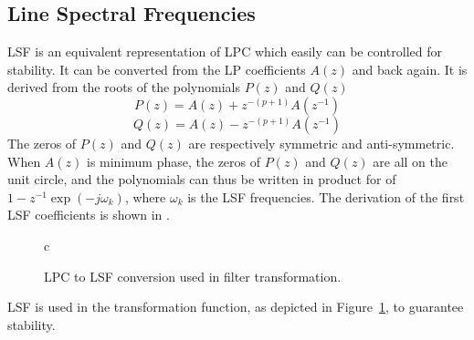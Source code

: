 \subsection{Line Spectral Frequencies} %
\label{sub:line_spectral_frequencies}

LSF is an equivalent representation of LPC which easily can be controlled for stability. It can be converted from the LP coefficients $A(z)$ and back again. It is derived from the roots of the polynomials $P(z)$ and $Q(z)$ 
\begin{equation}
	\label{eq:p_z}
	P(z) = A(z)+z^{-(p+1)}A(z^{-1})
\end{equation}
\begin{equation}
	\label{eq:q_z}
	Q(z) = A(z)-z^{-(p+1)}A(z^{-1})
\end{equation}
The zeros of $P(z)$ and $Q(z)$ are respectively symmetric and anti-symmetric. When $A(z)$ is minimum phase, the zeros of $P(z)$ and $Q(z)$ are all on the unit circle, and the polynomials can thus be written in product for of
$1-z^{-1}\exp(-j\omega_k)$, where $\omega_k$ is the LSF frequencies. The derivation of the first LSF coefficients is shown in \cite[p. 304]{taletek}.

\begin{figure}[htbp]
	\centering
	\begin{tabular}[h]{c}
	\end{tabular}
	\caption{LPC to LSF conversion used in filter transformation.}
	\label{fig:lpc_to_lsf}
\end{figure}
LSF is used in the transformation function, as depicted in Figure~\ref{fig:lpc_to_lsf}, to guarantee stability.



